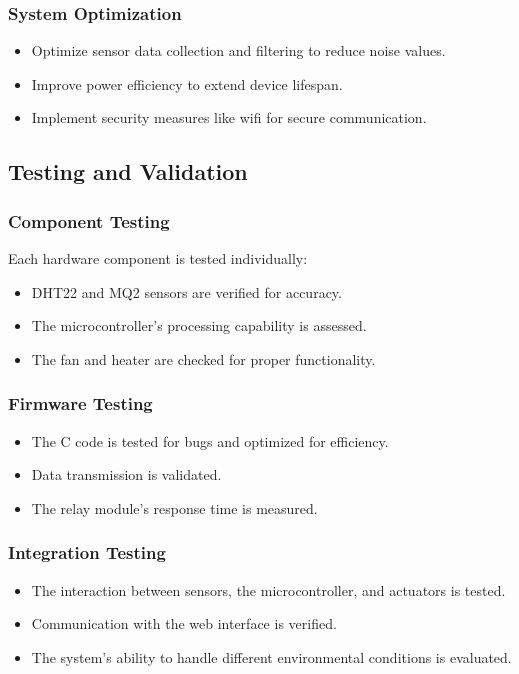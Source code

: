 \documentclass[a4paper]{scrartcl}
\begin{document}
\subsubsection{System Optimization}
\begin{itemize}
\item Optimize sensor data collection and filtering to reduce noise values.
\item Improve power efficiency to extend device lifespan.
\item Implement security measures like wifi  for secure communication.
\end{itemize}

\subsection{Testing and Validation}

\subsubsection{Component Testing}
Each hardware component is tested individually:
\begin{itemize}
\item DHT22 and MQ2 sensors are verified for accuracy.
\item The microcontroller's processing capability is assessed.
\item The fan and heater are checked for proper functionality.
\end{itemize}

\subsubsection{Firmware Testing}
\begin{itemize}
\item The C code is tested for bugs and optimized for efficiency.
\item Data transmission is validated.
\item The relay module's response time is measured.
\end{itemize}

\subsubsection{Integration Testing}
\begin{itemize}
\item The interaction between sensors, the microcontroller, and actuators is tested.
\item Communication with the web interface is verified.
\item The system's ability to handle different environmental conditions is evaluated.
\end{itemize}
\end{document}
